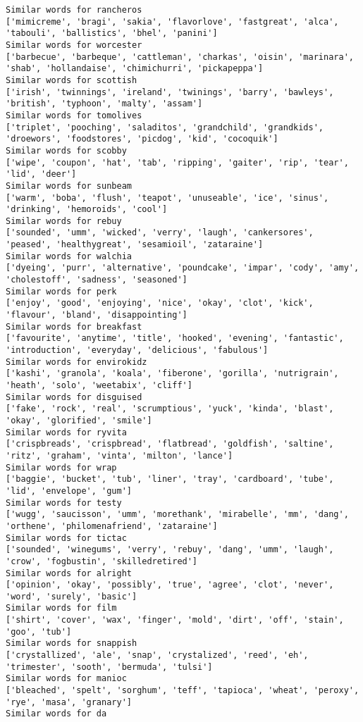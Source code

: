 \documentclass[11pt]{article}
\begin{document}
\begin{Verbatim}[commandchars=\\\{\}]
Similar words for rancheros
['mimicreme', 'bragi', 'sakia', 'flavorlove', 'fastgreat', 'alca', 'tabouli', 'ballistics', 'bhel', 'panini']
Similar words for worcester
['barbecue', 'barbeque', 'cattleman', 'charkas', 'oisin', 'marinara', 'shab', 'hollandaise', 'chimichurri', 'pickapeppa']
Similar words for scottish
['irish', 'twinnings', 'ireland', 'twinings', 'barry', 'bawleys', 'british', 'typhoon', 'malty', 'assam']
Similar words for tomolives
['triplet', 'pooching', 'saladitos', 'grandchild', 'grandkids', 'droewors', 'foodstores', 'picdog', 'kid', 'cocoquik']
Similar words for scobby
['wipe', 'coupon', 'hat', 'tab', 'ripping', 'gaiter', 'rip', 'tear', 'lid', 'deer']
Similar words for sunbeam
['warm', 'boba', 'flush', 'teapot', 'unuseable', 'ice', 'sinus', 'drinking', 'hemoroids', 'cool']
Similar words for rebuy
['sounded', 'umm', 'wicked', 'verry', 'laugh', 'cankersores', 'peased', 'healthygreat', 'sesamioil', 'zataraine']
Similar words for walchia
['dyeing', 'purr', 'alternative', 'poundcake', 'impar', 'cody', 'amy', 'cholestoff', 'sadness', 'seasoned']
Similar words for perk
['enjoy', 'good', 'enjoying', 'nice', 'okay', 'clot', 'kick', 'flavour', 'bland', 'disappointing']
Similar words for breakfast
['favourite', 'anytime', 'title', 'hooked', 'evening', 'fantastic', 'introduction', 'everyday', 'delicious', 'fabulous']
Similar words for envirokidz
['kashi', 'granola', 'koala', 'fiberone', 'gorilla', 'nutrigrain', 'heath', 'solo', 'weetabix', 'cliff']
Similar words for disguised
['fake', 'rock', 'real', 'scrumptious', 'yuck', 'kinda', 'blast', 'okay', 'glorified', 'smile']
Similar words for ryvita
['crispbreads', 'crispbread', 'flatbread', 'goldfish', 'saltine', 'ritz', 'graham', 'vinta', 'milton', 'lance']
Similar words for wrap
['baggie', 'bucket', 'tub', 'liner', 'tray', 'cardboard', 'tube', 'lid', 'envelope', 'gum']
Similar words for testy
['wugg', 'saucisson', 'umm', 'morethank', 'mirabelle', 'mm', 'dang', 'orthene', 'philomenafriend', 'zataraine']
Similar words for tictac
['sounded', 'winegums', 'verry', 'rebuy', 'dang', 'umm', 'laugh', 'crow', 'fogbustin', 'skilledretired']
Similar words for alright
['opinion', 'okay', 'possibly', 'true', 'agree', 'clot', 'never', 'word', 'surely', 'basic']
Similar words for film
['shirt', 'cover', 'wax', 'finger', 'mold', 'dirt', 'off', 'stain', 'goo', 'tub']
Similar words for snappish
['crystallized', 'ale', 'snap', 'crystalized', 'reed', 'eh', 'trimester', 'sooth', 'bermuda', 'tulsi']
Similar words for manioc
['bleached', 'spelt', 'sorghum', 'teff', 'tapioca', 'wheat', 'peroxy', 'rye', 'masa', 'granary']
Similar words for da

\end{Verbatim}
\end{document}
